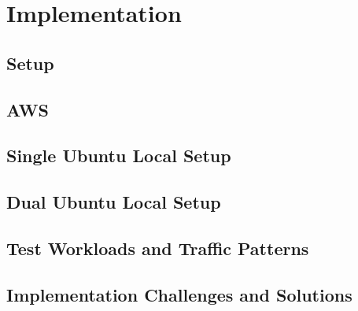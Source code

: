 \chapter{Implementation}

\section{Setup}

\section{AWS}

\section{Single Ubuntu Local Setup}

\section{Dual Ubuntu Local Setup}

\section{Test Workloads and Traffic Patterns}

\section{Implementation Challenges and Solutions}